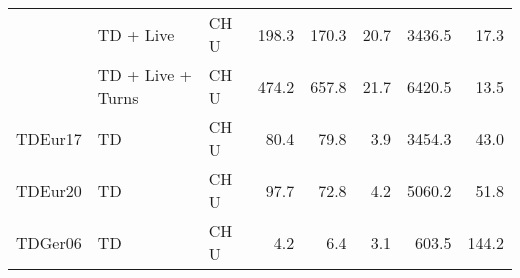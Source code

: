 \begin{tabular}{lllrrrrr}
        & TD + Live & CH U &            198.3 &            170.3 &      20.7 &                    3436.5 &     17.3 \\
        & TD + Live + Turns & CH U &            474.2 &            657.8 &      21.7 &                    6420.5 &     13.5 \\
\addlinespace
TDEur17 & TD & CH U &             80.4 &             79.8 &       3.9 &                    3454.3 &     43.0 \\
TDEur20 & TD & CH U &             97.7 &             72.8 &       4.2 &                    5060.2 &     51.8 \\
TDGer06 & TD & CH U &              4.2 &              6.4 &       3.1 &                     603.5 &    144.2 \\
\bottomrule
\end{tabular}

